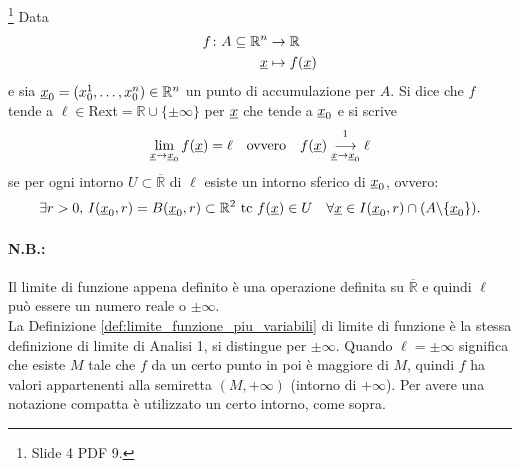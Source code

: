 \begin{definition}\label{def:limite_funzione_piu_variabili}\footnote{Slide 4 PDF 9.}
    Data
    \begin{equation*}
        \begin{aligned}
            f\colon A\subseteq\mathbb R^n & \rightarrow \mathbb R\\
            \uline x &\mapsto f(\uline x)
        \end{aligned}
    \end{equation*}
    e sia $\uline x_0=(x_0^1,\hdots,x_0^n)\in\mathbb R^n$ un punto di accumulazione per $A$. Si dice che $f$ tende a $\ell\in$\gls{Rext}$=\mathbb R\cup\{\pm\infty\}$ per $\uline x$ che tende a $\uline x_0$ e si scrive
    \begin{equation}\label{eq:limite_funzione_piu_variabili}
        \lim_{\uline x\rightarrow\uline x_0}f(\uline x)=\ell \quad\text{ovvero}\quad f(\uline x)\overset{\footnotemark}{\underset{\uline x\rightarrow\uline x_0}{\longrightarrow}}\ell
    \end{equation}
    \footnotemark se per ogni intorno $U\subset\overline{\mathbb R}$ di $\ell$ esiste un intorno sferico di $\uline x_0$, ovvero:
    \begin{equation*}
        \exists r>0,\, I(\uline x_0, r)=B(\uline x_0,r)\subset\mathbb R^2 \text{ tc } f(\uline x)\in U\quad \forall\uline x\in I(\uline x_0,r)\cap(A\backslash\{\uline x_0\}).
    \end{equation*}
\end{definition}

\addtocounter{footnote}{-1}


\paragraph{N.B.:} Il limite di funzione appena definito è una operazione definita su $\overline{\mathbb R}$ e quindi $\ell$ può essere un numero reale o $\pm\infty$.\\
La Definizione \ref{def:limite_funzione_piu_variabili} di limite di funzione è la stessa definizione di limite di Analisi 1, si distingue per $\pm\infty$. Quando $\ell=\pm\infty$ significa che esiste $M$ tale che $f$ da un certo punto in poi è maggiore di $M$, quindi $f$ ha valori appartenenti alla semiretta $(M,+\infty)$ (intorno di $+\infty$). Per avere una notazione compatta è utilizzato un certo intorno, come sopra.

